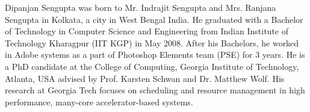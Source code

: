 Dipanjan Sengupta was born to Mr. Indrajit Sengupta and Mrs. Ranjana Sengupta in Kolkata, a city in West Bengal India. He graduated with a
Bachelor of Technology in Computer Science and Engineering from Indian Institute of Technology Kharagpur (IIT KGP) in May 2008. 
After his Bachelors, he worked in Adobe systems as a part of Photoshop Elements team (PSE) for 3 years.  He is a PhD candidate at the College of Computing, Georgia Institute of Technology, Atlanta, USA advised by Prof. Karsten Schwan and Dr. Matthew Wolf. 
His research at Georgia Tech focuses on scheduling and resource management in high performance, many-core accelerator-based systems. 

